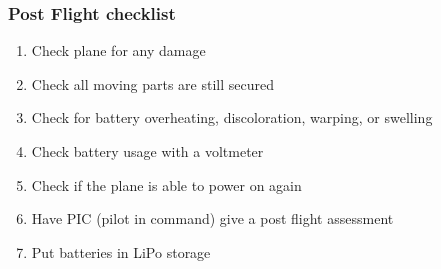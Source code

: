 \subsubsection{Post Flight checklist}
\begin{enumerate}[itemsep=-5pt]
  \item Check plane for any damage
  \item Check all moving parts are still secured
  \item Check for battery overheating, discoloration, warping, or swelling
  \item Check battery usage with a voltmeter
  \item Check if the plane is able to power on again
  \item Have PIC (pilot in command) give a post flight assessment
  \item Put batteries in LiPo storage
\end{enumerate}
